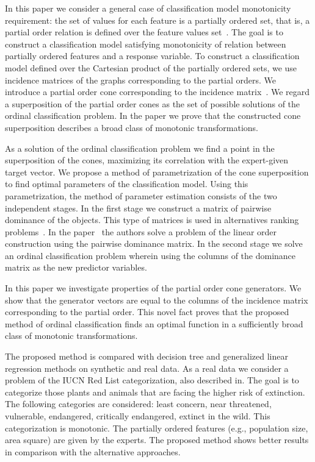 \documentclass[12pt,preprint]{elsarticle}
\begin{document}
In this paper we consider a general case of classification model monotonicity requirement: the set of values for each feature is a partially ordered set, that is, a partial order relation is defined over the feature values set~\cite{Cheng2010}. The goal is to construct a classification model satisfying monotonicity of relation between partially ordered features and a response variable. To construct a classification model defined over the Cartesian product of the partially ordered sets, we use incidence matrices of the graphs corresponding to the partial orders. We introduce a partial order cone corresponding to the incidence matrix~\cite{Kuznetsov2014, Dehnokhalaji2011256}. We regard a superposition of the partial order cones as the set of possible solutions of the ordinal classification problem. In the paper we prove that the constructed cone superposition describes a broad class of monotonic transformations.

As a solution of the ordinal classification problem we find a point in the superposition of the cones, maximizing its correlation with the expert-given target vector. We propose a method of parametrization of the cone superposition to find optimal parameters of the classification model. Using this parametrization, the method of parameter estimation consists of the two independent stages. In the first stage we construct a matrix of pairwise dominance of the objects. This type of matrices is used in alternatives ranking problems~\cite{Kaci2011,Busa-Fekete2013}. In the paper~\cite{Cohen1999} the authors solve a problem of the linear order construction using the pairwise dominance matrix. In the second stage we solve an ordinal classification problem wherein using the columns of the dominance matrix as the new predictor variables.

In this paper we investigate properties of the partial order cone generators. We show that the generator vectors are equal to the columns of the incidence matrix corresponding to the partial order. This novel fact proves that the proposed method of ordinal classification finds an optimal function in a sufficiently broad class of monotonic transformations.

The proposed method is compared with decision tree and generalized linear regression methods on synthetic and real data. As a real data we consider a problem of the IUCN Red List categorization, also described in. The goal is to categorize those plants and animals that are facing the higher risk of extinction. The following categories are considered: least concern, near threatened, vulnerable, endangered, critically endangered, extinct in the wild. This categorization is monotonic. The partially ordered features (e.g., population size, area square) are given by the experts. The proposed method shows better results in comparison with the alternative approaches.
\end{document}
